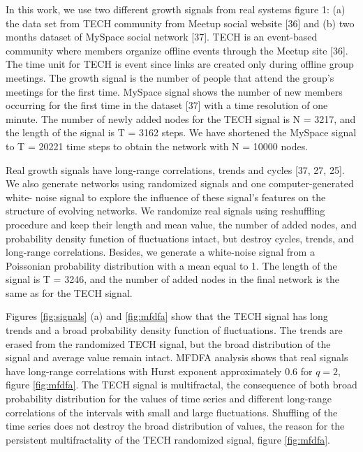 In this work, we use two different growth signals from real systems figure 1: (a) the
data set from TECH community from Meetup social website [36] and (b) two months
dataset of MySpace social network [37]. TECH is an event-based community where
members organize offline events through the Meetup site [36]. The time unit for TECH
is event since links are created only during offline group meetings. The growth signal
is the number of people that attend the group’s meetings for the first time. MySpace
signal shows the number of new members occurring for the first time in the dataset [37]
with a time resolution of one minute. The number of newly added nodes for the TECH
signal is N = 3217, and the length of the signal is T = 3162 steps. We have shortened
the MySpace signal to T = 20221 time steps to obtain the network with N = 10000
nodes.

Real growth signals have long-range correlations, trends and cycles [37, 27, 25]. We
also generate networks using randomized signals and one computer-generated white-
noise signal to explore the influence of these signal’s features on the structure of
evolving networks. We randomize real signals using reshuffling procedure and keep their
length and mean value, the number of added nodes, and probability density function
of fluctuations intact, but destroy cycles, trends, and long-range correlations. Besides,
we generate a white-noise signal from a Poissonian probability distribution with a mean
equal to 1. The length of the signal is T = 3246, and the number of added nodes in the
final network is the same as for the TECH signal.

Figures \ref{fig:signals} (a) and \ref{fig:mfdfa} show that the TECH signal has long trends and a broad probability density function of fluctuations. The trends are erased from the randomized TECH signal, but the broad distribution of the signal and average value remain intact. MFDFA analysis shows that real signals have long-range correlations with Hurst exponent approximately $0.6$ for $q=2$, figure \ref{fig:mfdfa}. The TECH signal is multifractal, the consequence of both broad probability distribution for the values of time series and different long-range correlations of the intervals with small and large fluctuations. Shuffling of the time series does not destroy the broad distribution of values, the reason for the persistent multifractality of the TECH randomized signal, figure \ref{fig:mfdfa}.


